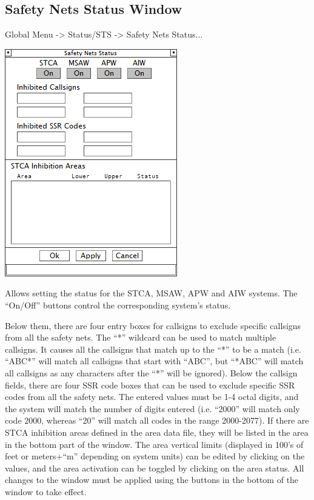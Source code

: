 \documentclass[11pt,a4paper,oldfontcommands]{memoir}
\begin{document}
\subsection{Safety Nets Status Window}
\label{win:snsw}

Global Menu -> Status/STS -> Safety Nets Status...

\includegraphics{img/snets.png}

Allows setting the status for the STCA, MSAW, APW and AIW systems. The “On/Off” buttons control the corresponding system’s status.

Below them, there are four entry boxes for callsigns to exclude specific callsigns from all the safety nets. The “*” wildcard can be used to match multiple callsigns. It causes all the callsigns that match up to the “*” to be a match (i.e. “ABC*” will match all callsigns that start with “ABC”, but “*ABC” will match all callsigns as any characters after the “*” will be ignored).
Below the callsign fields, there are four SSR code boxes that can be used to exclude specific SSR codes from all the safety nets. The entered values must be 1-4 octal digits, and the system will match the number of digits entered (i.e. “2000” will match only code 2000, whereas “20” will match all codes in the range 2000-2077).
If there are STCA inhibition areas defined in the area data file, they will be listed in the area in the bottom part of the window. The area vertical limits (displayed in 100’s of feet or meters+“m” depending on system units) can be edited by clicking on the values, and the area activation can be toggled by clicking on the area status.
All changes to the window must be applied using the buttons in the bottom of the window to take effect.
\end{document}
